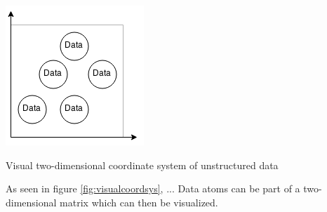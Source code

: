\begin{flfigure}
  \centering
    \includegraphics[width=0.5\linewidth]{00_resources/data_coord_system.png}
    \caption{Visual two-dimensional coordinate system of unstructured data}
  \label{fig:visualcoordsys}
\end{flfigure}

As seen in figure \ref{fig:visualcoordsys}, ...
Data atoms can be part of a two-dimensional matrix which can then be visualized.
